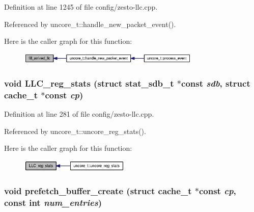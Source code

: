 Definition at line 1245 of file config/zesto-llc.cpp.

Referenced by uncore\_\-t::handle\_\-new\_\-packet\_\-event().

Here is the caller graph for this function:\nopagebreak
\begin{figure}[H]
\begin{center}
\leavevmode
\includegraphics[width=245pt]{config_2zesto-cache_8h_f1f903df28f067bfd63f3145c04a5870_icgraph}
\end{center}
\end{figure}
\subsubsection[{LLC\_\-reg\_\-stats}]{\setlength{\rightskip}{0pt plus 5cm}void LLC\_\-reg\_\-stats (struct {\bf stat\_\-sdb\_\-t} $\ast$const  {\em sdb}, \/  struct {\bf cache\_\-t} $\ast$const  {\em cp})}\label{config_2zesto-cache_8h_0a1aa47236ccba0a1d5e5818052a830d}




Definition at line 281 of file config/zesto-llc.cpp.

Referenced by uncore\_\-t::uncore\_\-reg\_\-stats().

Here is the caller graph for this function:\nopagebreak
\begin{figure}[H]
\begin{center}
\leavevmode
\includegraphics[width=147pt]{config_2zesto-cache_8h_0a1aa47236ccba0a1d5e5818052a830d_icgraph}
\end{center}
\end{figure}
\subsubsection[{prefetch\_\-buffer\_\-create}]{\setlength{\rightskip}{0pt plus 5cm}void prefetch\_\-buffer\_\-create (struct {\bf cache\_\-t} $\ast$const  {\em cp}, \/  const int {\em num\_\-entries})}\label{config_2zesto-cache_8h_16dacff1f1e08b2a7fe82d35f3733f91}




